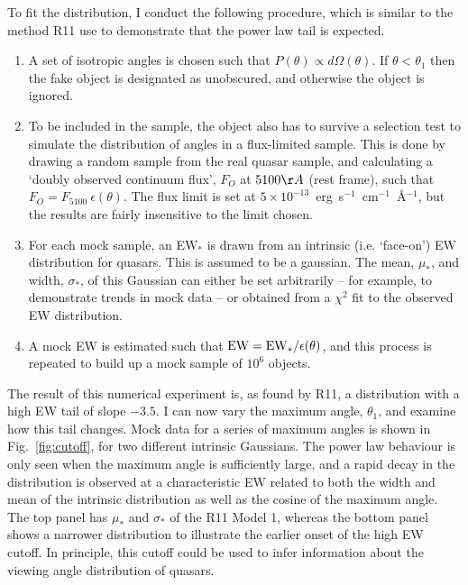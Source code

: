 To fit the distribution, I conduct the following procedure,
which is similar to the method R11 use to demonstrate that the power
law tail is expected.
\begin{enumerate}
	\setlength\itemsep{1em}
	\item A set of isotropic angles is chosen such that 
	$P(\theta)\propto d\Omega(\theta)$. 
	If $\theta<\theta_{1}$ then the fake object is designated as unobscured, 
	and otherwise the object is ignored. 
	\item To be included in the sample, the object also has to 
	survive a selection test
	to simulate the distribution of angles in a flux-limited sample.
	This is done by drawing a random sample from the real quasar sample, 
	and calculating a `doubly observed continuum flux', $F_O$ at $5100\AA$ 
	(rest frame), such that $F_O = F_{5100}~\epsilon(\theta)$. The flux limit
	is set at $5\times10^{-13}$~erg~s$^{-1}$~cm$^{-1}$~\AA$^{-1}$, but the results
	are fairly insensitive to the limit chosen.
	\item For each mock sample, an EW$_*$ is drawn from an intrinsic 
	(i.e. `face-on') EW distribution for quasars. This is assumed to be a
	gaussian. The mean, $\mu_*$, and width, $\sigma_*$, of this Gaussian
	can either be set arbitrarily -- for example, to demonstrate trends
	in mock data -- or obtained from a $\chi^2$ fit to the observed EW
	distribution.
	\item A mock EW is estimated such that ${\rm EW} = {\rm EW}_* / \epsilon(\theta)$,
	and this process is repeated to build up a mock sample of $10^6$ objects.
\end{enumerate}
The result of this numerical experiment is, as found by R11, a distribution
with a high EW tail of slope $-3.5$. I can now vary the maximum angle, $\theta_1$,
and examine how this tail changes. Mock data for a series
of maximum angles is shown in Fig.~\ref{fig:cutoff}, for two different intrinsic 
Gaussians. The power law behaviour is only seen when the maximum angle is
sufficiently large, and a rapid decay in the distribution is observed
at a characteristic EW related to both the width and mean of the
intrinsic distribution as well as the cosine of the maximum angle.
The top panel has $\mu_*$ and $\sigma_*$ of the R11 Model 1, 
whereas the bottom panel shows a narrower distribution to illustrate the 
earlier onset of the high EW cutoff. In principle, this cutoff could
be used to infer information about the viewing angle distribution
of quasars.

